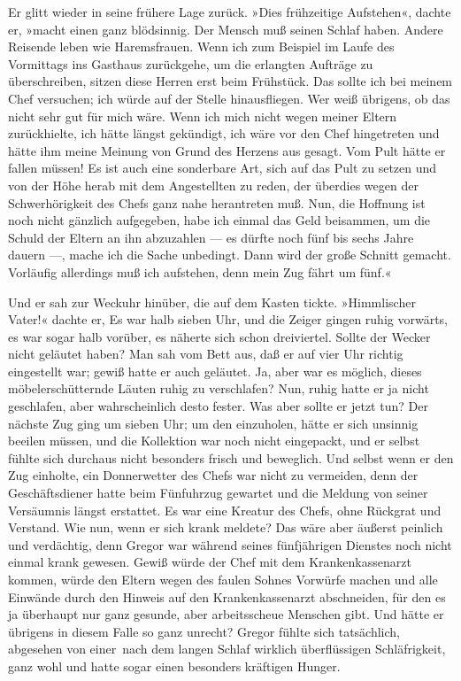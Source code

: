 Er glitt wieder in seine frühere Lage zurück. »Dies frühzeitige
Aufstehen«, dachte er, »macht einen ganz blödsinnig. Der Mensch muß
seinen Schlaf haben. Andere Reisende leben wie Haremsfrauen. Wenn ich
zum Beispiel im Laufe des Vormittags ins Gasthaus zurückgehe, um die
erlangten Aufträge zu überschreiben, sitzen diese Herren erst beim
Frühstück. Das sollte ich bei meinem Chef versuchen; ich würde auf der
Stelle hinausfliegen. Wer weiß übrigens, ob das nicht sehr gut für mich
wäre. Wenn ich mich nicht wegen meiner Eltern zurückhielte, ich hätte
längst gekündigt, ich wäre vor den Chef hingetreten und hätte ihm meine
Meinung von Grund des Herzens aus gesagt. Vom Pult hätte er fallen
müssen! Es ist auch eine sonderbare Art, sich auf das Pult zu setzen und
von der Höhe herab mit dem Angestellten zu reden, der überdies wegen der
Schwerhörigkeit des Chefs ganz nahe herantreten muß. Nun, die Hoffnung
ist noch nicht gänzlich aufgegeben, habe ich einmal das Geld beisammen,
um die Schuld der Eltern an ihn abzuzahlen --- es dürfte noch fünf bis
sechs Jahre dauern ---, mache ich die Sache unbedingt. Dann wird der
große Schnitt gemacht. Vorläufig allerdings muß ich aufstehen, denn mein
Zug fährt um fünf.«

Und er sah zur Weckuhr hinüber, die auf dem Kasten tickte. »Himmlischer
Vater!« dachte er, Es war halb sieben Uhr, und die Zeiger gingen ruhig
vorwärts, es war sogar halb vorüber, es näherte sich schon dreiviertel.
Sollte der Wecker nicht geläutet haben? Man sah vom Bett aus, daß er auf
vier Uhr richtig eingestellt war; gewiß hatte er auch geläutet. Ja, aber
war es möglich, dieses möbelerschütternde Läuten ruhig zu verschlafen?
Nun, ruhig hatte er ja nicht geschlafen, aber wahrscheinlich desto
fester. Was aber sollte er jetzt tun? Der nächste Zug ging um sieben
Uhr; um den einzuholen, hätte er sich unsinnig beeilen müssen, und die
Kollektion war noch nicht eingepackt, und er selbst fühlte sich durchaus
nicht besonders frisch und beweglich. Und selbst wenn er den Zug
einholte, ein Donnerwetter des Chefs war nicht zu vermeiden, denn der
Geschäftsdiener hatte beim Fünfuhrzug gewartet und die Meldung von
seiner Versäumnis längst erstattet. Es war eine Kreatur des Chefs, ohne
Rückgrat und Verstand. Wie nun, wenn er sich krank meldete? Das wäre
aber äußerst peinlich und verdächtig, denn Gregor war während seines
fünfjährigen Dienstes noch nicht einmal krank gewesen. Gewiß würde der
Chef mit dem Krankenkassenarzt kommen, würde den Eltern wegen des faulen
Sohnes Vorwürfe machen und alle Einwände durch den Hinweis auf den
Krankenkassenarzt abschneiden, für den es ja überhaupt nur ganz gesunde,
aber arbeitsscheue Menschen gibt. Und hätte er übrigens in diesem Falle
so ganz unrecht? Gregor fühlte sich tatsächlich, abgesehen von einer\est\
nach dem langen Schlaf wirklich überflüssigen Schläfrigkeit, ganz wohl
und hatte sogar einen besonders kräftigen Hunger.

